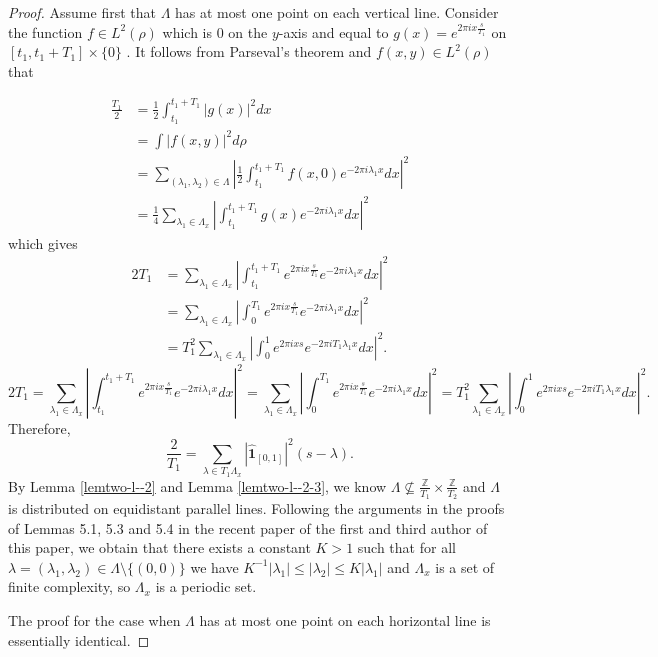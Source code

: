 \documentclass[12pt,a4paper,intlimits,sumlimits]{amsart}
\theoremstyle{plain}
\theoremstyle{definition}
\newcounter{rem}
\begin{document}
\begin{proof}
Assume first that $\Lambda$  has at most one point on each vertical line. Consider the function $f \in L^2(\rho)$ which is $0$ on the $y$-axis and equal to $g(x)=e^{2 \pi i x \frac{s}{T_1}}$ on $[t_1, t_1+T_1] \times\{0\}$ .
 It follows from Parseval's theorem and $f(x, y) \in L^2\left(\rho \right)$ that

$$
\begin{aligned}
\frac{T_1}{2} &= \frac{1}{2} \int_{t_1}^{t_1+T_1}|g(x)|^2 d x\\
   &= \int|f(x, y)|^2 d \rho\\
   & =\sum_{\left(\lambda_1, \lambda_2\right) \in \Lambda}\left|\frac{1}{2} \int_{t_1}^{t_1+T_1} f(x, 0) e^{-2 \pi i \lambda_1 x} d x\right|^2 \\
   & =\frac{1}{4} \sum_{\lambda_{1}  \in \Lambda_x}\left|\int_{t_1}^{t_1+T_1} g(x) e^{-2 \pi i \lambda_1 x} d x\right|^2
\end{aligned}
$$
which gives
\ifdefined\SMART
\begin{align*}
2T_1 &= \sum_{\lambda_{1}  \in  \Lambda_x}\left|\int_{t_1}^{t_1+T_1}e^{2 \pi i x \frac{s}{T_1}} e^{-2 \pi i \lambda_{1}  x} d x\right|^2\\
&= \sum_{\lambda_{ 1}  \in  \Lambda_x}\left|\int_{0}^{T_1}e^{2 \pi i x \frac{s}{T_1}} e^{-2 \pi i \lambda_{1} x} d x\right|^2\\
&= T_1^2\sum_{\lambda_1 \in  \Lambda_x}\left|\int_{0}^{1}e^{2 \pi i x s} e^{-2 \pi i T_1\lambda_1 x} d x\right|^2.
\end{align*}
\else
$$
2T_1 = \sum_{\lambda_{1}  \in  \Lambda_x}\left|\int_{t_1}^{t_1+T_1}e^{2 \pi i x \frac{s}{T_1}} e^{-2 \pi i \lambda_{1}  x} d x\right|^2
= \sum_{\lambda_{ 1}  \in  \Lambda_x}\left|\int_{0}^{T_1}e^{2 \pi i x \frac{s}{T_1}} e^{-2 \pi i \lambda_{1} x} d x\right|^2
= T_1^2\sum_{\lambda_1 \in  \Lambda_x}\left|\int_{0}^{1}e^{2 \pi i x s} e^{-2 \pi i T_1\lambda_1 x} d x\right|^2.
$$
\fi
Therefore,
$$
\frac{2}{T_1}=\sum_{\lambda \in T_1\Lambda_x}\left|\hat{ \mathbf{1}}_{\left[0, 1\right]}\right|^2\left(s-\lambda\right).
$$
By Lemma \ref{lemtwo-l--2}  and Lemma \ref{lemtwo-l--2-3},   we know $\Lambda \not\subseteq \frac{\mathbb{Z}}{T_1}\times\frac{\mathbb{Z}}{T_2}$ and $\Lambda $  is distributed on equidistant parallel lines. Following the arguments in the proofs of Lemmas 5.1, 5.3 and 5.4 in the recent paper \cite{kolountzakis2025spectrality} of the first and third author of this paper, we obtain that there exists a constant  $K>1$ such that for all $\lambda = (\lambda_1, \lambda_2) \in \Lambda \setminus \{(0,0)\}$ we have $K^{-1}\left|\lambda_1\right| \leq\left|\lambda_2\right| \leq K\left|\lambda_{1}\right|$  and $\Lambda_x$ is a set  of finite complexity,  so  $\Lambda_x$ is a  periodic set.

The proof for the case when $\Lambda$ has at most one point on each horizontal line  is essentially identical.

\end{proof}
\end{document}
